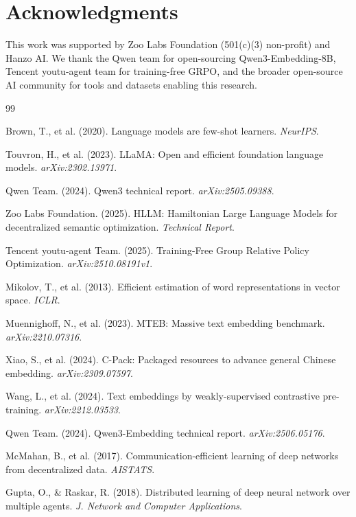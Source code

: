 \section*{Acknowledgments}


This work was supported by Zoo Labs Foundation (501(c)(3) non-profit) and Hanzo AI. We thank the Qwen team for open-sourcing Qwen3-Embedding-8B, Tencent youtu-agent team for training-free GRPO, and the broader open-source AI community for tools and datasets enabling this research.

\begin{thebibliography}{99}

Brown, T., et al. (2020). Language models are few-shot learners. \textit{NeurIPS}.

Touvron, H., et al. (2023). LLaMA: Open and efficient foundation language models. \textit{arXiv:2302.13971}.

Qwen Team. (2024). Qwen3 technical report. \textit{arXiv:2505.09388}.

Zoo Labs Foundation. (2025). HLLM: Hamiltonian Large Language Models for decentralized semantic optimization. \textit{Technical Report}.

Tencent youtu-agent Team. (2025). Training-Free Group Relative Policy Optimization. \textit{arXiv:2510.08191v1}.

Mikolov, T., et al. (2013). Efficient estimation of word representations in vector space. \textit{ICLR}.

Muennighoff, N., et al. (2023). MTEB: Massive text embedding benchmark. \textit{arXiv:2210.07316}.

Xiao, S., et al. (2024). C-Pack: Packaged resources to advance general Chinese embedding. \textit{arXiv:2309.07597}.

Wang, L., et al. (2024). Text embeddings by weakly-supervised contrastive pre-training. \textit{arXiv:2212.03533}.

Qwen Team. (2024). Qwen3-Embedding technical report. \textit{arXiv:2506.05176}.

McMahan, B., et al. (2017). Communication-efficient learning of deep networks from decentralized data. \textit{AISTATS}.

Gupta, O., \& Raskar, R. (2018). Distributed learning of deep neural network over multiple agents. \textit{J. Network and Computer Applications}.


\end{thebibliography}
